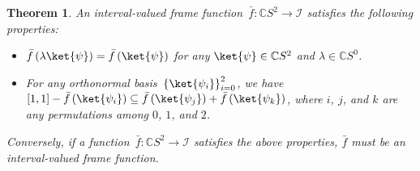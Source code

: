 \documentclass[12pt]{iopart}
\theoremstyle{plain}
\newtheorem{thm}{Theorem}
\theoremstyle{definition}
\theoremstyle{remark}
\begin{document}
\begin{thm}\label{thm:interval-valued-frame-function}An interval-valued
frame function~$\bar{f}:\mathbb{C}S^{2}\rightarrow\mathscr{I}$ satisfies
the following properties:
\begin{itemize}
\item $\bar{f}\left(\lambda\ket{\psi}\right)=\bar{f}\left(\ket{\psi}\right)$
for any $\ket{\psi}\in\mathbb{C}S^{2}$ and $\lambda\in\mathbb{C}S^{0}$. 
\item For any orthonormal basis~$\left\{ \ket{\psi_{i}}\right\} _{i=0}^{2}$,
we have $\left[1,1\right]-\bar{f}\left(\ket{\psi_{i}}\right)\subseteq\bar{f}\left(\ket{\psi_{j}}\right)+\bar{f}\left(\ket{\psi_{k}}\right)$,
where $i$, $j$, and $k$ are any permutations among $0$, $1$,
and $2$. 
\end{itemize}
Conversely, if a function~$\bar{f}:\mathbb{C}S^{2}\rightarrow\mathscr{I}$
satisfies the above properties, $\bar{f}$ must be an interval-valued
frame function.\end{thm}
\end{document}
